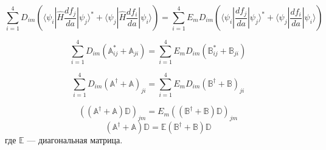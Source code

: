 \documentclass[a4paper,14pt]{extarticle}
\begin{document}
$$\sum_{i=1}^4 D_{im} \left( \langle\psi_i|\hat{H}\frac{d f_j}{da}|\psi_j\rangle^* + \langle\psi_j|\hat{H}\frac{d f_i}{da}|\psi_i\rangle  \right) = %
  \sum_{i=1}^4 E_mD_{im}\left( \langle\psi_i|\frac{d f_j}{da}|\psi_j\rangle^* + \langle\psi_j|\frac{d f_i}{da}|\psi_i\rangle \right)$$

$$\sum_{i=1}^4 D_{im} \left( \mathbb{A}_{ij}^* + \mathbb{A}_{ji}  \right) = %
  \sum_{i=1}^4 E_mD_{im}\left( \mathbb{B}_{ij}^* + \mathbb{B}_{ji} \right)$$

$$\sum_{i=1}^4 D_{im} \left( \mathbb{A}^{\dagger} + \mathbb{A} \right)_{ji} = %
  \sum_{i=1}^4 E_mD_{im}\left( \mathbb{B}^{\dagger} + \mathbb{B} \right)_{ji}$$

$$\left( \left( \mathbb{A}^{\dagger} + \mathbb{A} \right) \mathbb{D}  \right)_{jm} = E_m \left( \left( \mathbb{B}^{\dagger} + \mathbb{B} \right) \mathbb{D} \right)_{jm}$$
$$\left( \mathbb{A}^{\dagger} + \mathbb{A} \right) \mathbb{D} = \mathbb{E} \left( \mathbb{B}^{\dagger} + \mathbb{B} \right) \mathbb{D}$$
где $\mathbb{E}$ --- диагональная матрица.
\end{document}
